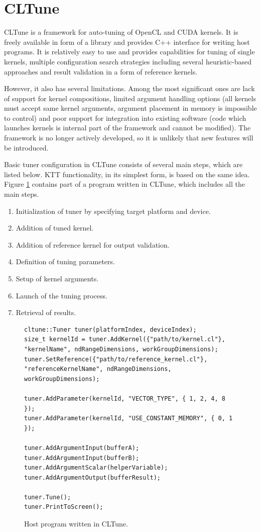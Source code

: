\documentclass
[
    digital, %
    oneside, %
    table, %
    nolof, %
    nolot, %
    nocover %
]{fithesis3}
\begin{document}
\section{CLTune}
CLTune \cite{cltune} is a framework for auto-tuning of OpenCL and CUDA kernels. It is freely available in form of a library and provides C++ interface
for writing host programs. It is relatively easy to use and provides capabilities for tuning of single kernels, multiple configuration search
strategies including several heuristic-based approaches and result validation in a form of reference kernels.

However, it also has several limitations. Among the most significant ones are lack of support for kernel compositions, limited argument handling
options (all kernels must accept same kernel arguments, argument placement in memory is impossible to control) and poor support for integration into
existing software (code which launches kernels is internal part of the framework and cannot be modified). The framework is no longer actively developed,
so it is unlikely that new features will be introduced.

Basic tuner configuration in CLTune consists of several main steps, which are listed below. KTT functionality, in its simplest form, is based on the
same idea. Figure \ref{cltune-example} contains part of a program written in CLTune, which includes all the main steps.
\begin{enumerate}
    \item Initialization of tuner by specifying target platform and device.
    \item Addition of tuned kernel.
    \item Addition of reference kernel for output validation.
    \item Definition of tuning parameters.
    \item Setup of kernel arguments.
    \item Launch of the tuning process.
    \item Retrieval of results.
\end{enumerate}
\begin{figure}
\begin{lstlisting}
cltune::Tuner tuner(platformIndex, deviceIndex);
size_t kernelId = tuner.AddKernel({"path/to/kernel.cl"}, "kernelName", ndRangeDimensions, workGroupDimensions);
tuner.SetReference({"path/to/reference_kernel.cl"}, "referenceKernelName", ndRangeDimensions, workGroupDimensions);

tuner.AddParameter(kernelId, "VECTOR_TYPE", { 1, 2, 4, 8 });
tuner.AddParameter(kernelId, "USE_CONSTANT_MEMORY", { 0, 1 });

tuner.AddArgumentInput(bufferA);
tuner.AddArgumentInput(bufferB);
tuner.AddArgumentScalar(helperVariable);
tuner.AddArgumentOutput(bufferResult);

tuner.Tune();
tuner.PrintToScreen();
\end{lstlisting}
\caption{Host program written in CLTune.}
\label{cltune-example}
\end{figure}
\end{document}
